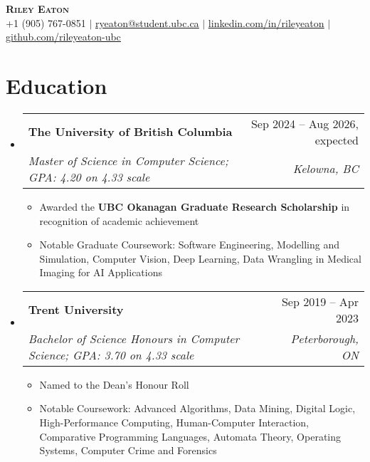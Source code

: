 \documentclass[letterpaper,11.5pt]{article}
\makeatletter
\newcommand{\resumeItem}[1]{
  \item\small{
    {#1 \vspace{-2pt}}
  }
}
\newcommand{\resumeSubheading}[4]{
  \vspace{-2pt}\item
    \begin{tabular*}{0.97\textwidth}[t]{l@{\extracolsep{\fill}}r}
      \textbf{#1} & #2 \\
      \textit{\small#3} & \textit{\small #4} \\
    \end{tabular*}\vspace{-7pt}
}
\newcommand{\resumeSubHeadingListStart}{\begin{itemize}[leftmargin=0.15in, label={}]}
\newcommand{\resumeSubHeadingListEnd}{\end{itemize}}
\newcommand{\resumeItemListStart}{\begin{itemize}}
\newcommand{\resumeItemListEnd}{\end{itemize}\vspace{-5pt}}
\def\iconSpace{0.5pt}
\makeatother
\begin{document}
\begin{center}
    \textbf{\Huge \scshape Riley Eaton} \\ \vspace{2pt}
    \small \faPhoneSquare \hspace{\iconSpace} +1 (905) 767-0851
    $|$ \faEnvelope \hspace{\iconSpace} \underline{\href{mailto:ryeaton@student.ubc.ca}{ryeaton@student.ubc.ca}}
    $|$ \faLinkedinSquare \hspace{\iconSpace} \underline{\href{https://linkedin.com/in/rileyeaton}{linkedin.com/in/rileyeaton}}
    $|$ \faGithub \hspace{\iconSpace} \underline{\href{https://github.com/rileyeaton-ubc}{github.com/rileyeaton-ubc}}
\end{center}

\section{Education}
  \resumeSubHeadingListStart
    \resumeSubheading
      {The University of British Columbia}{Sep 2024 -- Aug 2026, expected}
      {Master of Science in Computer Science; GPA: 4.20 on 4.33 scale}{Kelowna, BC}
      \resumeItemListStart
        \resumeItem{Awarded the \textbf{UBC Okanagan Graduate Research Scholarship} in recognition of academic achievement}
        \resumeItem{Notable Graduate Coursework: Software Engineering, Modelling and Simulation, Computer Vision, Deep Learning, Data Wrangling in Medical Imaging for AI Applications}
      \resumeItemListEnd
    \resumeSubheading
      {Trent University}{Sep 2019 -- Apr 2023}
      {Bachelor of Science Honours in Computer Science; GPA: 3.70 on 4.33 scale}{Peterborough, ON}
      \resumeItemListStart
        \resumeItem{Named to the Dean's Honour Roll}
        \resumeItem{Notable Coursework: Advanced Algorithms, Data Mining, Digital Logic, High-Performance Computing, Human-Computer Interaction, Comparative Programming Languages, Automata Theory, Operating Systems, Computer Crime and Forensics}
      \resumeItemListEnd
  \resumeSubHeadingListEnd

\end{document}
